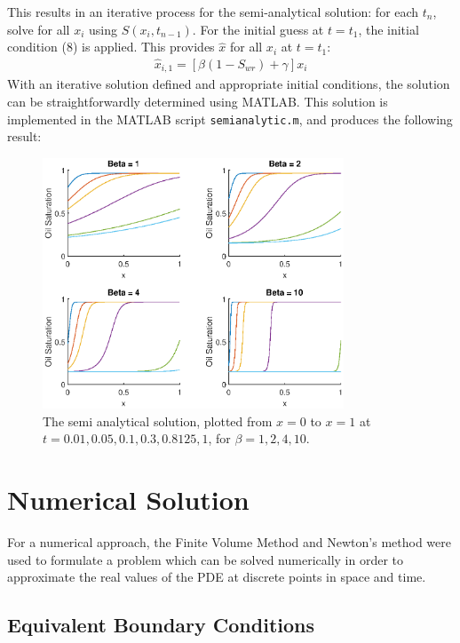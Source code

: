 \documentclass[11pt]{article}
\begin{document}
This results in an iterative process for the semi-analytical solution: for each $t_n$, solve for all $x_i$ using $S(x_i,t_{n-1})$. For the initial guess at $t=t_1$, the initial condition (8) is applied. This provides $\hat x$ for all $x_i$ at $t=t_1$:
\begin{eqnarray}
\hat x_{i,1} = \left[\beta (1-S_{wr})+\gamma\right]x_i
\end{eqnarray}
With an iterative solution defined and appropriate initial conditions, the solution can be straightforwardly determined using MATLAB. This solution is implemented in the MATLAB script \verb|semianalytic.m|, and produces the following result:
\begin{figure}[!h]
\centering
\includegraphics[width=0.8\textwidth]{semianalyticsolution.eps}
\caption{The semi analytical solution, plotted from $x=0$ to $x=1$ at $t=0.01, 0.05, 0.1, 0.3, 0.8125, 1$, for $\beta=1,2,4,10$.}
\end{figure}


\smallbreak
\section{Numerical Solution}
For a numerical approach, the Finite Volume Method and Newton's method were used to formulate a problem which can be solved numerically in order to approximate the real values of the PDE at discrete points in space and time. 
\subsection{Equivalent Boundary Conditions}
\end{document}
